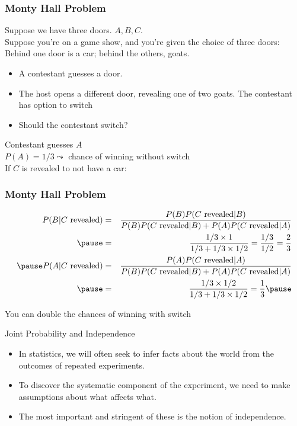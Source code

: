 \documentclass[handout]{beamer}
\numberwithin{equation}{section}
\begin{document}
\begin{frame}
\frametitle{Monty Hall Problem}

Suppose we have three doors.  $A, B, C$.  \pause \\
Suppose you're on a game show, and you're given the choice of three doors: Behind one door is a car; behind the others, goats. \\ \pause 
\begin{itemize}
\item[-] A contestant guesses a door. \pause 
\item[-] The host opens a different door, revealing one of two goats. The contestant has option to switch \pause 
\item[-] Should the contestant switch? \pause 
\end{itemize}

Contestant guesses $A$\\ \pause 
$P(A) = 1/3 \leadsto$ chance of winning without switch\\ \pause 
If $C$ is revealed to not have a car:\\

\end{frame}


\begin{frame}
\frametitle{Monty Hall Problem}

\pause 
\begin{eqnarray}
P(B| C \text{ revealed} ) & = & \frac{P(B)P(C \text{ revealed} | B)}{P(B)P(C \text{ revealed} | B) + P(A) P(C \text{ revealed} | A) } \nonumber \\ \pause 
& = & \frac{1/3 \times 1}{1/3 + 1/3 \times 1/2 } = \frac{1/3}{1/2} = \frac{2}{3}\nonumber \\ \pause 
P(A| C \text{ revealed} ) & = & \frac{P(A) P(C \text{ revealed} | A)}{ P(B)P(C \text{ revealed} | B) + P(A) P(C \text{ revealed} | A) }\nonumber \\ \pause 
& = & \frac{1/3 \times 1/2}{1/3 + 1/3 \times 1/2} = \frac{1}{3} \nonumber \pause 
\end{eqnarray}

\alert{You can double the chances of winning with switch}


\end{frame}



\begin{frame}{Joint Probability and Independence}

\begin{itemize}
\item In statistics, we will often seek to infer facts about the world from the outcomes of repeated experiments.\pause
\item To discover the systematic component of the experiment, we need to make assumptions about what affects what.\pause
\item The most important and stringent of these is the notion of independence.
\end{itemize}
\end{frame}
\end{document}
